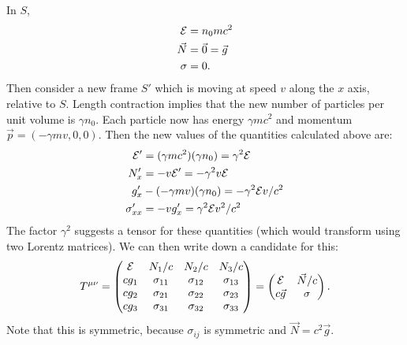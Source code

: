 \documentclass[../Main.tex]{subfiles}
\begin{document}
In $S$,
\begin{align*}
    \mathcal{E} &= n_0 mc^2 \\
    \vec{N} &= \vec{0} = \vec{g} \\
    \sigma &= 0.
\end{align*}
Then consider a new frame $S'$ which is moving at speed $v$ along the $x$ axis, relative to $S$. Length contraction implies that the new number of particles per unit volume is $\gamma n_0$. Each particle now has energy $\gamma mc^2$ and momentum $\vec{p} = (-\gamma m v, 0, 0)$. Then the new values of the quantities calculated above are:
\begin{align*}
    \mathcal{E}' &= (\gamma m c^2)(\gamma n_0) = \gamma^2 \mathcal{E} \\
    N_x' &= -v\mathcal{E}' = -\gamma^2 v \mathcal{E} \\
    g_x' &- (-\gamma m v)(\gamma n_0) = -\gamma^2 \mathcal{E} v / c^2 \\
    \sigma'_{xx} &= -vg_x' = \gamma^2 \mathcal{E} v^2 / c^2
\end{align*}
The factor $\gamma^2$ suggests a tensor for these quantities (which would transform using two Lorentz matrices). We can then write down a candidate for this:
\begin{equation*}
    T^{\mu\nu} =
    \begin{pmatrix}
        \mathcal{E} & N_1 / c & N_2 / c & N_3 / c \\
        cg_1 & \sigma_{11} & \sigma_{12} & \sigma_{13} \\
        cg_2 & \sigma_{21} & \sigma_{22} & \sigma_{23} \\
        cg_3 & \sigma_{31} & \sigma_{32} & \sigma_{33}
    \end{pmatrix}
    =
    \begin{pmatrix}
        \mathcal{E} & \vec{N} / c \\
        c\vec{g} & \sigma
    \end{pmatrix}.
\end{equation*}
Note that this is symmetric, because $\sigma_{ij}$ is symmetric and $\vec{N} = c^2 \vec{g}$.
\end{document}
